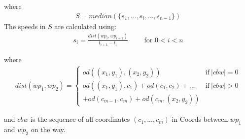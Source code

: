 where
\begin{align*}
S = median(\{s_1,...,s_i,...,s_{n-1}\})
\end{align*}
%
The speeds in $S$ are calculated using:
\begin{align*}
s_i = \frac{dist(wp_i, wp_{i+1})}{t_{i+1} - t_i} \qquad \text{ for } 0 < i < n
\end{align*}

where
\begin{align*}
dist(wp_1, wp_2) = \begin{cases}
od((x_1, y_1), (x_2, y_2)) & \text{if}\ |cbw| = 0 \\
od((x_1, y_1), c_1) + od(c_1, c_2) + ... & \text{if}\ |cbw| > 0 \\
+ od(c_{m-1}, c_m) + od(c_m, (x_2, y_2))
\end{cases}
\end{align*}

and $cbw$ is the sequence of all coordinates $(c_1,...,c_m)$ in Coords between $wp_1$ and $wp_2$ on the way.
